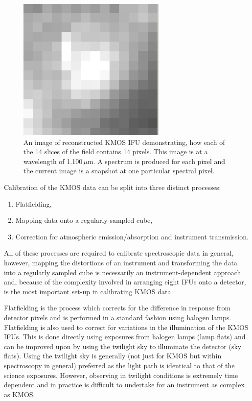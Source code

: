 \begin{figure}
 \centering
 \includegraphics[width=0.65\textwidth]{kmos/kmos-ifu}
 \caption[Example of a KMOS IFU]{An image of reconstructed KMOS IFU demonstrating, how each of the 14 slices of the field contains 14 pixels.
 This image is at a wavelength of 1.100\,$\mu$m.
 A spectrum is produced for each pixel and the current image is a snapshot at one particular spectral pixel.
 \label{fig:kmosIFU}}
\end{figure}

Calibration of the KMOS data can be split into three distinct processes:

\begin{enumerate}
    \item Flatfielding,
    \item Mapping data onto a regularly-sampled cube,
    \item Correction for atmospheric emission/absorption and instrument transmission.
\end{enumerate}

All of these processes are required to calibrate spectroscopic data in general, however, mapping the distortions of an instrument and transforming the data into a regularly sampled cube is necessarily an instrument-dependent approach and,
because of the complexity involved in arranging eight IFUs onto a detector, is the most important set-up in calibrating KMOS data.

Flatfielding is the process which corrects for the difference in response from detector pixels and is performed in a standard fashion using halogen lamps.
Flatfielding is also used to correct for variations in the illumination of the KMOS IFUs.
This is done directly using exposures from halogen lamps (lamp flats) and can be improved upon by using the twilight sky to illuminate the detector (sky flats).
Using the twilight sky is generally (not just for KMOS but within spectroscopy in general) preferred as the light path is identical to that of the science exposures.
However, observing in twilight conditions is extremely time dependent and in practice is difficult to undertake for an instrument as complex as KMOS.

